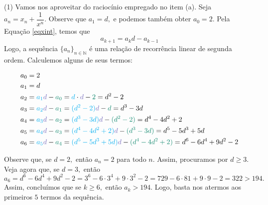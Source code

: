 \documentclass[12pt, a4paper]{article}
\newcommand{\negrito}[1]{\mbox{\boldmath{$#1$}}}
\newcommand{\itens}[1]{\begin{tasks}[label={(tsk[a])},label-width=3.6ex, label-format = {\bfseries}, column-sep = {0pt}](1) #1\end{tasks}}
\newcommand{\alt}[1]{\textcolor{Floresta}{$\negrito{(#1)} $}}
\begin{document}
\begin{solution}
\itens{
\task[\alt{b}] Vamos nos aproveitar do raciocínio empregado no item (a). Seja $a_n = x_n + \dfrac{1}{x^n}.$ Observe que $a_1 = d,$ e podemos também obter $a_0 = 2.$ Pela Equação \ref{eqxint}, temos que
\[
a_{k+1} = a_kd - a_{k-1}
\]
Logo, a sequência $\{ a_n \}_{n\in \mathbb{N}}$ é uma relação de recorrência linear de segunda ordem. Calculemos alguns de seus termos:}
\begin{align*}
    a_0 &= 2 \\
    a_1 &= d \\
    a_2 &= \textcolor{Cyan}{a_1}\textcolor{Periwinkle}{d} - \textcolor{PineGreen}{a_0} = \textcolor{Cyan}{d} \cdot \textcolor{Periwinkle}{d} - \textcolor{PineGreen}{2} = d^2 - 2 \\
    a_3 &= \textcolor{Cyan}{a_2}\textcolor{Periwinkle}{d} - \textcolor{PineGreen}{a_1} = \textcolor{Cyan}{(d^2 - 2)}\textcolor{Periwinkle}{d} - \textcolor{PineGreen}{d} = d^3 - 3d \\
    a_4 &= \textcolor{Cyan}{a_3}\textcolor{Periwinkle}{d} - \textcolor{PineGreen}{a_2} = \textcolor{Cyan}{(d^3 - 3d)}\textcolor{Periwinkle}{d} - \textcolor{PineGreen}{(d^2 -2)} = d^4 - 4d^2 + 2 \\
    a_5 &= \textcolor{Cyan}{a_4}\textcolor{Periwinkle}{d} - \textcolor{PineGreen}{a_3} = \textcolor{Cyan}{(d^4 - 4d^2 + 2)}\textcolor{Periwinkle}{d} - \textcolor{PineGreen}{(d^3 -3d)} = d^5 - 5d^3 + 5d \\
    a_6 &= \textcolor{Cyan}{a_5}\textcolor{Periwinkle}{d} - \textcolor{PineGreen}{a_4} = \textcolor{Cyan}{(d^5 - 5d^3 + 5d)}\textcolor{Periwinkle}{d} - \textcolor{PineGreen}{(d^4 - 4d^2 + 2)} = d^6 - 6d^4 + 9d^2 - 2 \\
\end{align*}

Observe que, se $d = 2,$ então $a_n = 2$ para todo $n.$ Assim, procuramos por $d \ge 3.$ Veja agora que, se $d = 3,$ então
\[
a_6 = d^6 - 6d^4 + 9d^2 - 2 = 3^6 - 6 \cdot 3^4 + 9 \cdot 3^2 - 2 = 729 - 6 \cdot 81 + 9 \cdot 9 - 2 = 322 > 194.
\]
Assim, concluímos que se $k \ge 6,$ então $a_k > 194.$ Logo, basta nos atermos aos primeiros $5$ termos da sequência.


\end{solution}
\end{document}
